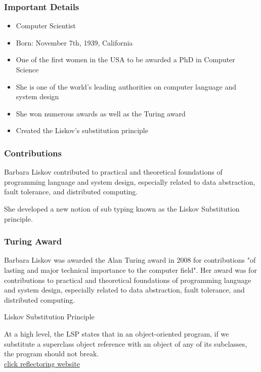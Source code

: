 \documentclass{beamer}
\begin{document}
\begin{frame}
\frametitle{Important Details}
\begin{itemize}
\item Computer Scientist
\item Born: November 7th, 1939, California
\item One of the first women in the USA to be awarded a PhD in Computer Science
\item She is one of the world's leading authorities on computer language and system design
\item She won numerous awards as well as the Turing award
\item Created the Liskov's substitution principle
\end{itemize}
\end{frame}


\begin{frame}
\frametitle{Contributions}

Barbara Liskov contributed to practical and theoretical foundations of programming language and system design, especially related to data abstraction, fault tolerance, and distributed computing. 

\vspace{5mm} %
She developed a new notion of sub typing known as the Liskov Substitution principle.


\end{frame}


\begin{frame}
\frametitle{Turing Award}
Barbara Liskov was awarded the Alan Turing award in 2008 for  contributions "of lasting and major technical importance to the computer field". Her award was for contributions to practical and theoretical foundations of programming language and system design, especially related to data abstraction, fault tolerance, and distributed computing. 
\begin{theorem}[Title]
\centering
Liskov Substitution Principle
\end{theorem}
At a high level, the LSP states that in an object-oriented program, if we substitute a superclass object reference with an object of any of its subclasses, the program should not break.\\
\href{https://reflectoring.io/lsp-explained/}{click reflectoring website}
\end{frame}
\end{document}
